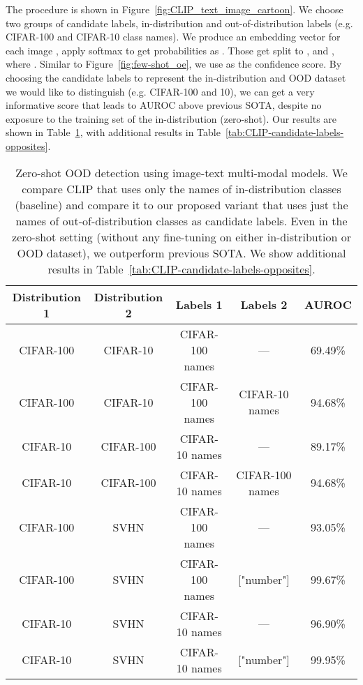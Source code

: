 \documentclass{article}
\begin{document}
The procedure is shown in Figure~\ref{fig:CLIP_text_image_cartoon}. We choose two groups of candidate labels, in-distribution and out-of-distribution labels (e.g. CIFAR-100 and CIFAR-10 class names). We produce an embedding vector  for each image , apply softmax to get probabilities as . Those get split to , and , where . 
Similar to Figure~\ref{fig:few-shot_oe}, we use  as the confidence score. 
By choosing the candidate labels to represent the in-distribution and OOD dataset we would like to distinguish (e.g. CIFAR-100 and 10), we can get a very informative score that leads to AUROC above previous SOTA, despite no exposure to the training set of the in-distribution (zero-shot). Our results are shown in Table~\ref{tab:CLIP-candidate-labels}, with additional results in Table~\ref{tab:CLIP-candidate-labels-opposites}.


\begin{table}[ht]
\begin{center}	
\vspace{-1em}
\caption{Zero-shot OOD detection using image-text multi-modal models. We compare CLIP that uses only the names of in-distribution classes (baseline) and compare it to our proposed variant that uses just the names of out-of-distribution classes as candidate labels.  
Even in the zero-shot setting (without any fine-tuning on either in-distribution or OOD dataset), we outperform previous SOTA. We show additional results in  Table~\ref{tab:CLIP-candidate-labels-opposites}. }
\vspace{0.5em}
\begin{tabular}{ c|c|c|c|c } 
	Distribution 1 & Distribution 2 & Labels 1 & Labels 2 & AUROC \\
	\hline
		CIFAR-100 & CIFAR-10 & CIFAR-100 names & --- & 69.49\% \\
				CIFAR-100 & CIFAR-10 & CIFAR-100 names & CIFAR-10 names & 94.68\% \\
\hline
				CIFAR-10 & CIFAR-100 & CIFAR-10 names & ---  & 89.17\% \\
				CIFAR-10 & CIFAR-100 & CIFAR-10 names & CIFAR-100 names & 94.68\% \\

\hline
	CIFAR-100 & SVHN & CIFAR-100 names & --- & 93.05\% \\
	CIFAR-100 & SVHN & CIFAR-100 names & ["number"] & 99.67\% \\
	\hline
	CIFAR-10 & SVHN & CIFAR-10 names & --- & 96.90\% \\
	CIFAR-10 & SVHN & CIFAR-10 names & ["number"] & 99.95\% \\ \hline
\end{tabular}
\label{tab:CLIP-candidate-labels}
\end{center}
\end{table}
\end{document}

